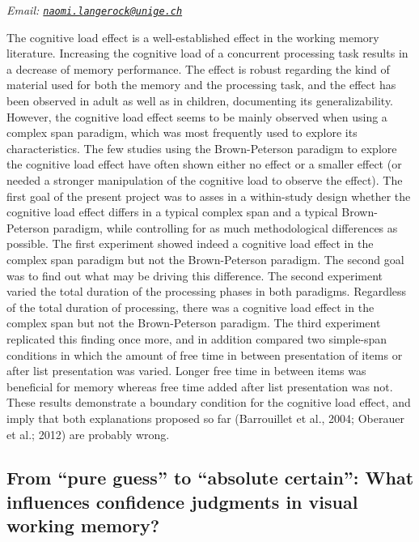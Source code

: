 \documentclass[
  12pt,
]{book}
\begin{document}
\emph{Email: \href{mailto:naomi.langerock@unige.ch}{\nolinkurl{naomi.langerock@unige.ch}}}

The cognitive load effect is a well-established effect in the working memory literature. Increasing the cognitive load of a concurrent processing task results in a decrease of memory performance. The effect is robust regarding the kind of material used for both the memory and the processing task, and the effect has been observed in adult as well as in children, documenting its generalizability. However, the cognitive load effect seems to be mainly observed when using a complex span paradigm, which was most frequently used to explore its characteristics. The few studies using the Brown-Peterson paradigm to explore the cognitive load effect have often shown either no effect or a smaller effect (or needed a stronger manipulation of the cognitive load to observe the effect). The first goal of the present project was to asses in a within-study design whether the cognitive load effect differs in a typical complex span and a typical Brown-Peterson paradigm, while controlling for as much methodological differences as possible. The first experiment showed indeed a cognitive load effect in the complex span paradigm but not the Brown-Peterson paradigm. The second goal was to find out what may be driving this difference. The second experiment varied the total duration of the processing phases in both paradigms. Regardless of the total duration of processing, there was a cognitive load effect in the complex span but not the Brown-Peterson paradigm. The third experiment replicated this finding once more, and in addition compared two simple-span conditions in which the amount of free time in between presentation of items or after list presentation was varied. Longer free time in between items was beneficial for memory whereas free time added after list presentation was not. These results demonstrate a boundary condition for the cognitive load effect, and imply that both explanations proposed so far (Barrouillet et al., 2004; Oberauer et al.; 2012) are probably wrong.

\hypertarget{from-pure-guess-to-absolute-certain-what-influences-confidence-judgments-in-visual-working-memory}{%
\subsection{From ``pure guess'' to ``absolute certain'': What influences confidence judgments in visual working memory?}\label{from-pure-guess-to-absolute-certain-what-influences-confidence-judgments-in-visual-working-memory}}
\end{document}
